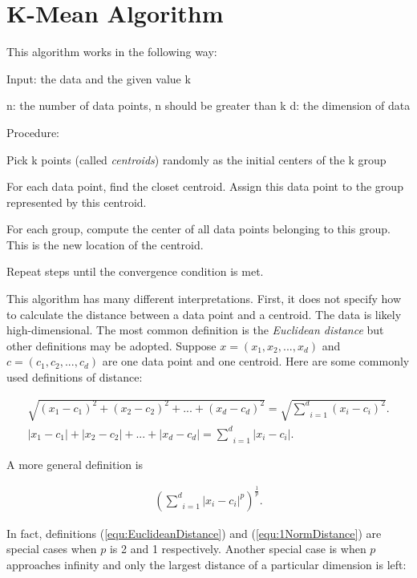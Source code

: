 \section{K-Mean Algorithm}


This algorithm works in the
following way: 

Input: the data and the given value k

n: the number of data points, n should be greater than k
d: the dimension of data

Procedure:

Pick k points (called {\it centroids}) randomly as the initial centers of the k group

For each data point, find the closet centroid. Assign this data point to the group represented by this centroid.

For each group, compute the center of all data points belonging to this group. This is the new location of the centroid.

Repeat steps until the convergence condition is met.


This algorithm has many different interpretations. First, it does not
specify how to calculate the distance between a data point and a
centroid.  The data is likely high-dimensional.  The most common
definition is the {\it Euclidean distance} but other definitions may
be adopted.  Suppose $x = (x_1, x_2, ..., x_d)$ and $c = (c_1, c_2,
..., c_d)$ are one data point and one centroid.  Here are some
commonly used definitions of distance:

\begin{gather}
  \sqrt{(x_1 - c_1) ^ 2 + (x_2 - c_2) ^ 2 + ... + (x_d - c_d) ^ 2} = \sqrt{\underset{i=1}{\overset{d}{\sum}} (x_i - c_i) ^ 2}.
  \label{equ:EuclideanDistance}
    \\
    |x_1 - c_1 |  + | x_2 - c_2 |  + ... + | x_d - c_d | = \underset{i=1}{\overset{d}{\sum}} |x_i - c_i|.
    \label{equ:1NormDistance}
\end{gather}

A more general definition is

\begin{gather}
  (\underset{i=1}{\overset{d}{\sum}} |x_i - c_i| ^ p) ^ {\frac{1}{p}}.
\end{gather}

In fact, definitions (\ref{equ:EuclideanDistance}) and
(\ref{equ:1NormDistance}) are special cases when $p$ is 2 and 1
respectively.  Another special case is when $p$ approaches
infinity and only  the largest distance of a particular
dimension is left:

